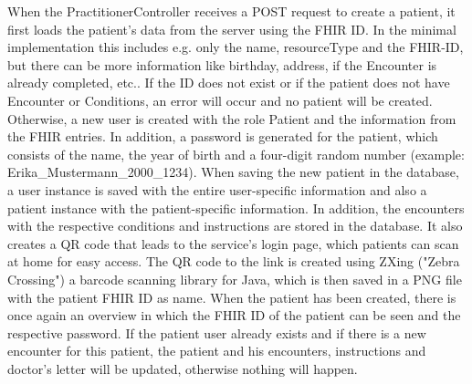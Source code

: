 \documentclass[]{report}
\begin{document}
When the PractitionerController receives a POST request to create a patient, it first loads the patient's data from the server using the FHIR ID. In the minimal implementation this includes e.g. only the name, resourceType and the FHIR-ID, but there can be more information like birthday, address, if the Encounter is already completed, etc.. If the ID does not exist or if the patient does not have Encounter or Conditions, an error will occur and no patient will be created. Otherwise, a new user is created with the role Patient and the information from the FHIR entries. In addition, a password is generated for the patient, which consists of the name, the year of birth and a four-digit random number (example: Erika\_Mustermann\_2000\_1234). When saving the new patient in the database, a user instance is saved with the entire user-specific information and also a patient instance with the patient-specific information. In addition, the encounters with the respective conditions and instructions are stored in the database. It also creates a QR code that leads to the service's login page, which patients can scan at home for easy access. The QR code to the link is created using ZXing ("Zebra Crossing") \cite{zxing} a barcode scanning library for Java, which is then saved in a PNG file with the patient FHIR ID as name. When the patient has been created, there is once again an overview in which the FHIR ID of the patient can be seen and the respective password. If the patient user already exists and if there is a new encounter for this patient, the patient and his encounters, instructions and doctor's letter will be updated, otherwise nothing will happen.
\end{document}
